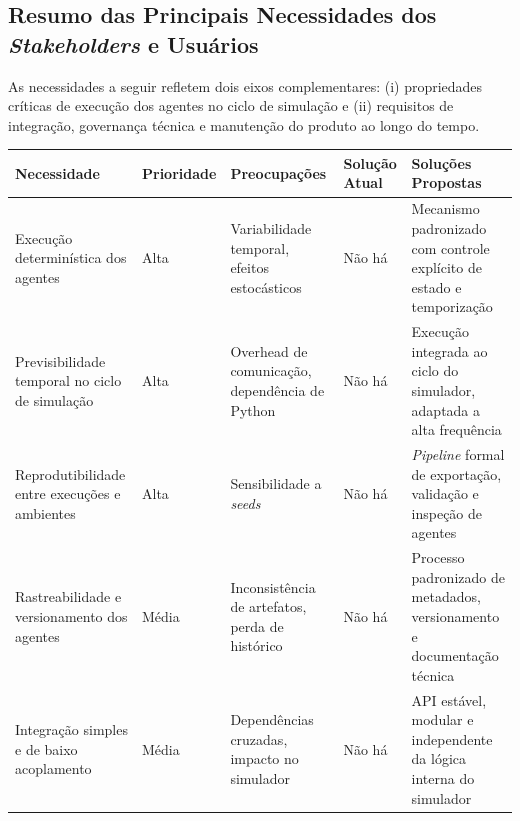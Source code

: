 \newpage

\subsection{Resumo das Principais Necessidades dos \emph{Stakeholders} e Usuários}

As necessidades a seguir refletem dois eixos complementares: (i) propriedades críticas de execução dos agentes no ciclo de simulação e (ii) requisitos de integração, governança técnica e manutenção do produto ao longo do tempo.

\begin{table}[h]
    \begin{tabular}{| p{} | p{} | p{} | p{} | p{} |}
        \hline
        \textbf{Necessidade} & \textbf{Prioridade} & \textbf{Preocupações} & \textbf{Solução Atual} & \textbf{Soluções Propostas} \\ \hline
        
        Execução determinística dos agentes &
        Alta &
        Variabilidade temporal, efeitos estocásticos &
        Não há &
        Mecanismo padronizado com controle explícito de estado e temporização \\ \hline
        
        Previsibilidade temporal no ciclo de simulação &
        Alta &
        Overhead de comunicação, dependência de Python &
        Não há &
        Execução integrada ao ciclo do simulador, adaptada a alta frequência \\ \hline
        
        Reprodutibilidade entre execuções e ambientes &
        Alta &
        Sensibilidade a \emph{seeds} &
        Não há &
        \emph{Pipeline} formal de exportação, validação e inspeção de agentes \\ \hline
        
        Rastreabilidade e versionamento dos agentes &
        Média &
        Inconsistência de artefatos, perda de histórico &
        Não há &
        Processo padronizado de metadados, versionamento e documentação técnica \\ \hline
        
        Integração simples e de baixo acoplamento &
        Média &
        Dependências cruzadas, impacto no simulador &
        Não há &
        API estável, modular e independente da lógica interna do simulador \\ \hline
        
    \end{tabular}
\end{table}

